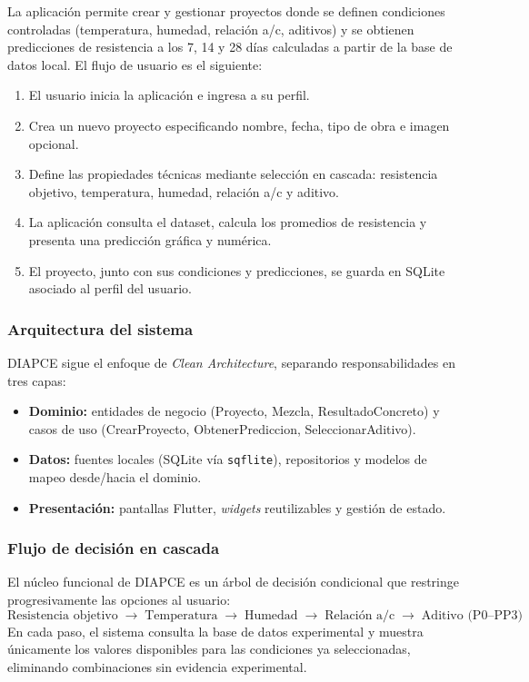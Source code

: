 La aplicación permite crear y gestionar proyectos donde se definen condiciones controladas (temperatura, humedad, relación a/c, aditivos) y se obtienen predicciones de resistencia a los 7, 14 y 28 días calculadas a partir de la base de datos local. El flujo de usuario es el siguiente:

\begin{enumerate}
    \item El usuario inicia la aplicación e ingresa a su perfil.
    \item Crea un nuevo proyecto especificando nombre, fecha, tipo de obra e imagen opcional.
    \item Define las propiedades técnicas mediante selección en cascada: resistencia objetivo, temperatura, humedad, relación a/c y aditivo.
    \item La aplicación consulta el dataset, calcula los promedios de resistencia y presenta una predicción gráfica y numérica.
    \item El proyecto, junto con sus condiciones y predicciones, se guarda en SQLite asociado al perfil del usuario.
\end{enumerate}

\subsubsection*{Arquitectura del sistema}

DIAPCE sigue el enfoque de \textit{Clean Architecture}, separando responsabilidades en tres capas:
\begin{itemize}
    \item \textbf{Dominio:} entidades de negocio (Proyecto, Mezcla, ResultadoConcreto) y casos de uso (CrearProyecto, ObtenerPrediccion, SeleccionarAditivo).
    \item \textbf{Datos:} fuentes locales (SQLite vía \texttt{sqflite}), repositorios y modelos de mapeo desde/hacia el dominio.
    \item \textbf{Presentación:} pantallas Flutter, \textit{widgets} reutilizables y gestión de estado.
\end{itemize}

\subsubsection*{Flujo de decisión en cascada}

El núcleo funcional de DIAPCE es un árbol de decisión condicional que restringe progresivamente las opciones al usuario:
\[
\text{Resistencia objetivo} \;\rightarrow\; \text{Temperatura} \;\rightarrow\; \text{Humedad} \;\rightarrow\; \text{Relación a/c} \;\rightarrow\; \text{Aditivo (P0--PP3)}
\]
En cada paso, el sistema consulta la base de datos experimental y muestra únicamente los valores disponibles para las condiciones ya seleccionadas, eliminando combinaciones sin evidencia experimental.

